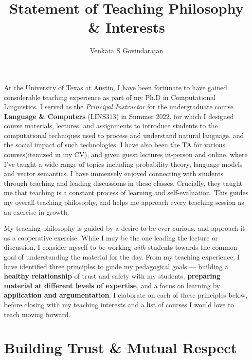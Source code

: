 \documentclass[11pt, letterpaper]{practical-report}
\title[]{Statement of Teaching Philosophy \& Interests}
\author{Venkata S Govindarajan}
\date{}
\begin{document}
\maketitle

At the University of Texas at Austin, I have been fortunate to have gained considerable teaching experience as part of my Ph.D in Computational Linguistics.  I served as the \emph{Principal Instructor} for the undergraduate course \textbf{Language \& Computers} ({\rmcs LINS313}) in Summer 2022, for which I designed course materials, lectures, and assignments to introduce students to the computational techniques used to process and understand natural language, and the social impact of such technologies. I have also been the TA for various courses(itemized in my CV), and given guest lectures in-person and online, where I’ve taught a wide range of topics including probability theory, language models and vector semantics. I have immensely enjoyed connecting with students through teaching and leading discussions in these classes. Crucially, they taught me that teaching is a constant process of learning and self-evaluation. This guides my overall teaching philosophy, and helps me approach every teaching session as an exercise in growth.

My teaching philosophy is guided by a desire to be ever curious, and approach it as a cooperative exercise. While I may be the one leading the lecture or discussion, I consider myself to be working \emph{with} students towards the common goal of understanding the material for the day. From my teaching experience, I have identified three principles to guide my pedagogical goals --- building a \textbf{healthy relationship} of trust and safety with my students, \textbf{preparing material at different levels of expertise}, and a focus on learning by \textbf{application and argumentation}. I elaborate on each of these principles below, before closing with my teaching interests and a list of courses I would love to teach moving forward.

\section*{Building Trust \& Mutual Respect}
\end{document}
